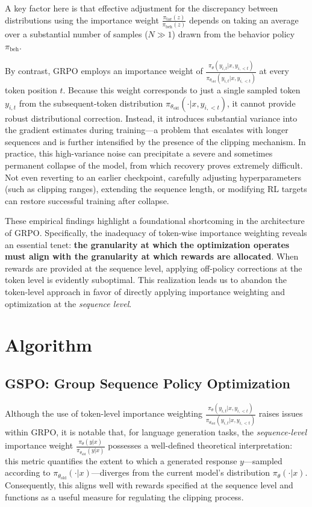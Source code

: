 A key factor here is that effective adjustment for the discrepancy between distributions using the importance weight $\frac{ \pi_\text{tar} (z) }{ \pi_\text{beh} (z)}$ depends on taking an average over a substantial number of samples ($N \gg 1$) drawn from the behavior policy $\pi_\text{beh}$.

By contrast, GRPO employs an importance weight of $\frac{ \pi_{\theta} (y_{i,t} | x, y_{i,<t}) }{ \pi_{\theta_\text{old}} (y_{i,t} | x,y_{i,<t})}$ at every token position $t$. Because this weight corresponds to just a single sampled token $y_{i,t}$ from the subsequent-token distribution $\pi_{\theta_\text{old}}( \cdot | x, y_{i, <t})$, it cannot provide robust distributional correction. Instead, it introduces substantial variance into the gradient estimates during training—a problem that escalates with longer sequences and is further intensified by the presence of the clipping mechanism. In practice, this high-variance noise can precipitate a severe and sometimes permanent collapse of the model, from which recovery proves extremely difficult. Not even reverting to an earlier checkpoint, carefully adjusting hyperparameters (such as clipping ranges), extending the sequence length, or modifying RL targets can restore successful training after collapse.

These empirical findings highlight a foundational shortcoming in the architecture of GRPO. Specifically, the inadequacy of token-wise importance weighting reveals an essential tenet: \textbf{the granularity at which the optimization operates must align with the granularity at which rewards are allocated}. When rewards are provided at the sequence level, applying off-policy corrections at the token level is evidently suboptimal. This realization leads us to abandon the token-level approach in favor of directly applying importance weighting and optimization at the \textit{sequence level}.

\section{Algorithm}

\subsection{GSPO: Group Sequence Policy Optimization}

Although the use of token-level importance weighting $\frac{ \pi_{\theta} (y_{i,t} | x, y_{i,<t}) }{ \pi_{\theta_\text{old}} (y_{i,t} | x,y_{i,<t})}$ raises issues within GRPO, it is notable that, for language generation tasks, the \textit{sequence-level} importance weight $\frac{ \pi_{\theta} (y | x) }{ \pi_{\theta_\text{old}} (y | x)}$ possesses a well-defined theoretical interpretation: this metric quantifies the extent to which a generated response $y$—sampled according to $\pi_{\theta_\text{old}} (\cdot | x)$—diverges from the current model's distribution $\pi_{\theta} (\cdot | x)$. Consequently, this aligns well with rewards specified at the sequence level and functions as a useful measure for regulating the clipping process.

